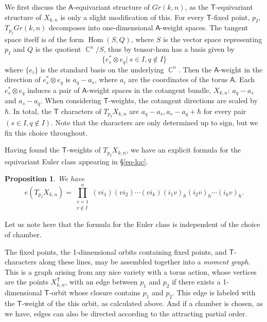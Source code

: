 \documentclass[12 pt]{article}
\theoremstyle{plain}
\theoremstyle{plain}
\theoremstyle{plain}
\theoremstyle{plain}
\theoremstyle{plain}
\theoremstyle{plain}
\theoremstyle{plain}
\newtheorem{proposition}{Proposition}[section]
\theoremstyle{plain}
\theoremstyle{plain}
\theoremstyle{plain}
\theoremstyle{remark}
\theoremstyle{remark}
\theoremstyle{definition}
\theoremstyle{definition}
\theoremstyle{definition}
\theoremstyle{definition}
\theoremstyle{definition}
\theoremstyle{definition}
\DeclareMathOperator{\C}{\mathbb{C}}
\DeclareMathOperator{\Hom}{Hom}
\newcommand{\bT}{\mathsf{T}}
\newcommand{\bA}{\mathsf{A}}
\begin{document}
    We first discuss the $\bA$-equivariant structure of $Gr(k,n)$, as the $\bT$-equivariant structure of $X_{k,n}$ is only a slight modification of this. For every $\bT$-fixed point, $p_I$, $T_{p_I}Gr(k,n)$ decomposes into one-dimensional $\bA$-weight spaces. The tangent space itself is of the form $\Hom(S,Q)$, where $S$ is the vector space representing $p_I$ and $Q$ is the quotient $\C^n/S$, thus by tensor-hom has a basis given by 
\[
\big\{e_s^*\otimes e_q \big|\ s\in I,q\not \in I\big\}
\]
where $\{e_i\}$ is the standard basis on the underlying $\C^n$. Then the $\bA$-weight in the direction of $e^*_s\otimes e_q$ is $a_q-a_s$, where $a_i$ are the coordinates of the torus $\bA$. Each $e_s^*\otimes e_q$ induces a pair of $\bA$-weight spaces in the cotangent bundle, $X_{k,n}$: $a_q-a_s$ and $a_s-a_q$. When considering $\bT$-weights, the cotangent directions are scaled by $\hbar$. In total, the $\bT$ characters of $T_{p_I}X_{k,n}$ are $a_q-a_s,a_s-a_q+\hbar$ for every pair $(s\in I,q\not\in I)$. Note that the characters are only determined up to sign, but we fix this choice throughout. 

Having found the $\bT$-weights of $T_{p_I}X_{k,n}$, we have an explicit formula for the equivariant Euler class appearing in \S\ref{eq-loc}.
\begin{proposition}
We have
\[
e(T_{p_I}X_{k,n}) = \prod\limits_{\substack{v=1\\v\not \in I}}^n (vi_1)(vi_2)\cdots(vi_k)(i_1v)_\hbar(i_2v)_\hbar\cdots (i_kv)_\hbar.
\]
\end{proposition}

Let us note here that the formula for the Euler class is independent of the choice of chamber. 

The fixed points, the 1-dimensional orbits containing fixed points, and $\bT$-characters along these lines, may be assembled together into a \textit{moment graph}. This is a graph arising from any nice variety with a torus action, whose vertices are the points $X_{k,n}^{\bT}$, with an edge between $p_1$ and $p_2$ if there exists a 1-dimensional $\bT$-orbit whose closure contains $p_1$ and $p_2$. This edge is labeled with the $\bT$-weight of the this orbit, as calculated above. And if a chamber is chosen, as we have, edges can also be directed according to the attracting partial order. 
\end{document}
